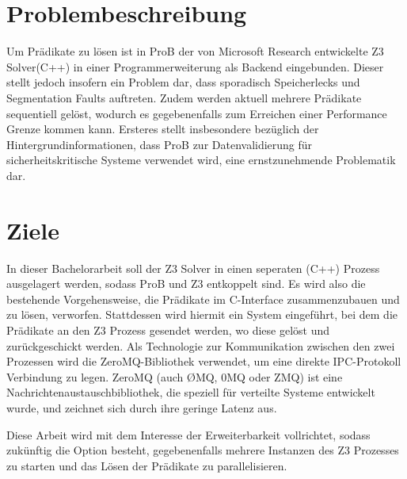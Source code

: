 \documentclass[11pt,a4paper]{scrartcl}
\begin{document}
\section{Problembeschreibung}
Um Prädikate zu lösen ist in ProB der von Microsoft Research entwickelte Z3 Solver(C++) \parencite{Z3_2} in einer Programmerweiterung als Backend eingebunden.
Dieser stellt jedoch insofern ein Problem dar, dass sporadisch Speicherlecks und Segmentation Faults auftreten.
Zudem werden aktuell mehrere Prädikate sequentiell gelöst, wodurch es gegebenenfalls zum Erreichen einer Performance Grenze kommen kann.
Ersteres stellt insbesondere bezüglich der Hintergrundinformationen, dass ProB zur Datenvalidierung für sicherheitskritische Systeme verwendet wird, eine ernstzunehmende Problematik dar.
\section{Ziele}
In dieser Bachelorarbeit soll der Z3 Solver in einen seperaten (C++) Prozess ausgelagert werden, sodass ProB und Z3 entkoppelt sind.
Es wird also die bestehende Vorgehensweise, die Prädikate im C-Interface zusammenzubauen und zu lösen, verworfen.
Stattdessen wird hiermit ein System eingeführt, bei dem die Prädikate an den Z3 Prozess gesendet werden, wo diese gelöst und zurückgeschickt werden.
Als Technologie zur Kommunikation zwischen den zwei Prozessen wird die ZeroMQ-Bibliothek \parencite{ZeroMQ_2} verwendet, um eine direkte IPC-Protokoll Verbindung zu legen.
ZeroMQ (auch ØMQ, 0MQ oder ZMQ) ist eine Nachrichtenaustauschbibliothek, die speziell für verteilte Systeme entwickelt wurde, und zeichnet sich durch ihre geringe Latenz aus.

Diese Arbeit wird mit dem Interesse der Erweiterbarkeit vollrichtet, sodass zukünftig die Option besteht, gegebenenfalls mehrere Instanzen des Z3 Prozesses zu starten und
das Lösen der Prädikate zu parallelisieren.
\end{document}
